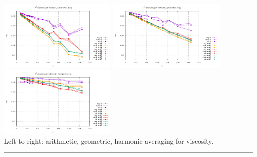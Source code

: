 \begin{center}
\includegraphics[width=5.7cm]{python_codes/fieldstone_13/RESULTS/vrms_am} 
\includegraphics[width=5.7cm]{python_codes/fieldstone_13/RESULTS/vrms_gm} 
\includegraphics[width=5.7cm]{python_codes/fieldstone_13/RESULTS/vrms_hm}\\
{\captionfont Left to right: arithmetic, geometric, harmonic averaging for viscosity.}
\end{center}

\newpage
\par\noindent\rule{\textwidth}{0.4pt}

\vspace{.5cm}

\begin{center}
\end{center}




